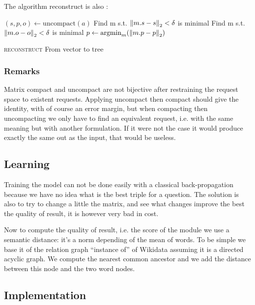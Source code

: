 The algorithm reconstruct is also :



\begin{algorithm}[H]
    \DontPrintSemicolon  %
    $(s,p,o) \gets \text{uncompact}(a)$\;
    Find m s.t. $\left\|m.s-s\right\|_2<\delta$ is minimal \;
    Find m s.t. $\left\|m.o-o\right\|_2<\delta$ is minimal \;
    $p \gets {\text{argmin}}_m  (\left\|m.p-p\right\|_2)$\;
    \;
    \caption{\textsc{reconstruct} From vector to tree}
\end{algorithm}

\subsubsection{Remarks}

Matrix compact and uncompact are not bijective after restraining the request space to existent requests. Applying uncompact then compact should give the identity, with of course an error margin, but when compacting then uncompacting we only have to find an equivalent request, i.e. with the same meaning but with another formulation. If it were not the case it would produce exactly the same out as the input, that would be useless.

\subsection{Learning}

Training the model can not be done easily with a classical back-propagation because we have no idea what is the best triple for a question. The solution is also to try to change a little the matrix, and see what changes improve the best the quality of result, it is however very bad in cost. 

Now to compute the quality of result, i.e. the score  of the module we use a semantic distance: it's a norm depending of the mean of words. To be simple we base it of the relation graph ``instance of'' of Wikidata assuming it is a directed acyclic graph. We compute the nearest common ancestor and we add the distance between this node and the two word  nodes.

\subsection{Implementation}


